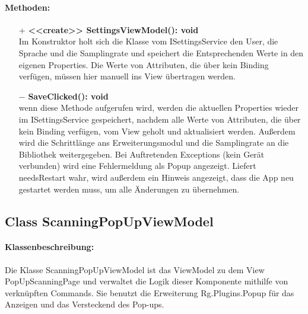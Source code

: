 \documentclass[a4paper,12pt]{article}
\begin{document}
\paragraph{Methoden:}
\begin{itemize}
    \item[+] \textbf{<<create>> SettingsViewModel(): void}\\ Im Konstruktor holt sich die Klasse vom ISettingsService den User, die Sprache und die Samplingrate und speichert die Entsprechenden Werte in den eigenen Properties. Die Werte von Attributen, die über kein Binding verfügen, müssen hier manuell ins View übertragen werden.
    \item[$-$] \textbf{SaveClicked(): void}\\ wenn diese Methode aufgerufen wird, werden die aktuellen Properties wieder im ISettingsService gespeichert, nachdem alle Werte von Attributen, die über kein Binding verfügen, vom View geholt und aktualisiert werden. Außerdem wird die Schrittlänge ans Erweiterungsmodul und die Samplingrate an die Bibliothek weitergegeben. Bei Auftretenden Exceptions (kein Gerät verbunden) wird eine Fehlermeldung als Popup angezeigt. Liefert needsRestart wahr, wird außerdem ein Hinweis angezeigt, dass die App neu gestartet werden muss, um alle Änderungen zu übernehmen. 
\end{itemize} 

\subsection{Class ScanningPopUpViewModel}
	\paragraph{Klassenbeschreibung:}
	Die Klasse ScanningPopUpViewModel ist das ViewModel zu dem View PopUpScanningPage und verwaltet die Logik dieser Komponente mithilfe von verknüpften Commands.
	Sie benutzt die Erweiterung \Gls{Rg.Plugins.Popup} für das Anzeigen und das Versteckend des Pop-ups.
	
\end{document}
